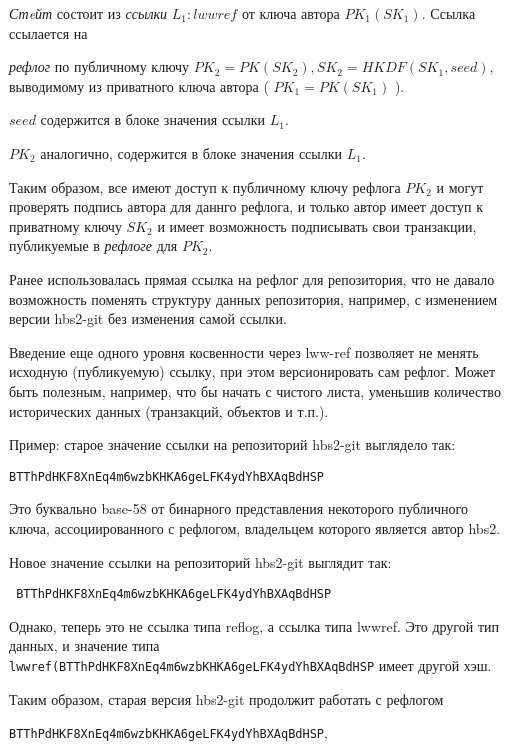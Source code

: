 \documentclass[11pt,a4paper]{article}
\begin{document}
\textit{Стeйт} состоит из \textit{ссылки} $L_1 : lwwref$ от ключа автора $PK_1(SK_1)$. Ссылка ссылается на

\textit{рефлог} по публичному ключу $PK_2 = PK(SK_2), SK_2 = HKDF(SK_1,seed)$, выводимому из приватного ключа автора
 ( $PK_1 = PK(SK_1)$ ).

 $seed$ содержится в блоке значения ссылки $L_1$.

 $PK_2$ аналогично, содержится в блоке значения ссылки $L_1$.

 Таким образом, все имеют доступ к публичному ключу рефлога $PK_2$ и могут проверять подпись автора
 для даннго рефлога, и только автор имеет доступ к  приватному ключу $SK_2$ и имеет возможность
 подписывать свои транзакции, публикуемые в \textit{рефлоге} для $PK_2$.

 Ранее использовалась прямая ссылка на рефлог для репозитория, что не давало возможность
 поменять структуру данных репозитория, например, с изменением версии hbs2-git без изменения
 самой ссылки.

 Введение еще одного уровня косвенности через lww-ref позволяет не менять исходную (публикуемую)
 ссылку, при этом версионировать сам рефлог. Может быть полезным, например, что бы начать с чистого
 листа, уменьшив количество исторических данных (транзакций, объектов и т.п.).

 Пример: старое значение ссылки на репозиторий hbs2-git выглядело так:

 \begin{verbatim}
BTThPdHKF8XnEq4m6wzbKHKA6geLFK4ydYhBXAqBdHSP
 \end{verbatim}

 Это буквально base-58 от бинарного представления некоторого публичного ключа, ассоциированного с
 рефлогом, владельцем которого является автор hbs2.

 Новое значение ссылки на репозиторий hbs2-git выглядит так:

 \begin{verbatim}
 BTThPdHKF8XnEq4m6wzbKHKA6geLFK4ydYhBXAqBdHSP
 \end{verbatim}

 Однако, теперь это не ссылка типа reflog, а ссылка типа lwwref. Это другой тип данных,
 и значение типа \texttt{lwwref(BTThPdHKF8XnEq4m6wzbKHKA6geLFK4ydYhBXAqBdHSP}
 имеет другой хэш.

 Таким образом, старая версия hbs2-git продолжит работать с рефлогом

 \texttt{BTThPdHKF8XnEq4m6wzbKHKA6geLFK4ydYhBXAqBdHSP},
\end{document}
